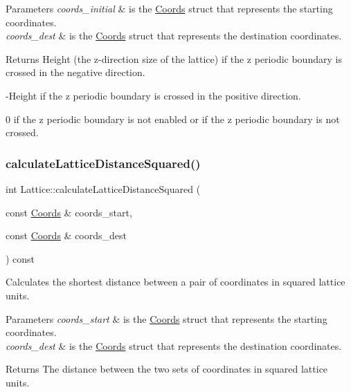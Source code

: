 \begin{DoxyParams}{Parameters}
{\em coords\+\_\+initial} & is the \hyperlink{struct_coords}{Coords} struct that represents the starting coordinates. \\
\hline
{\em coords\+\_\+dest} & is the \hyperlink{struct_coords}{Coords} struct that represents the destination coordinates. \\
\hline
\end{DoxyParams}
\begin{DoxyReturn}{Returns}
Height (the z-\/direction size of the lattice) if the z periodic boundary is crossed in the negative direction. 

-\/\+Height if the z periodic boundary is crossed in the positive direction. 

0 if the z periodic boundary is not enabled or if the z periodic boundary is not crossed. 
\end{DoxyReturn}
\mbox{\label{class_lattice_a3f51b0b41cf0e43e0469320310494a1e}} 
\subsubsection{\texorpdfstring{calculate\+Lattice\+Distance\+Squared()}{calculateLatticeDistanceSquared()}}
{\footnotesize\ttfamily int Lattice\+::calculate\+Lattice\+Distance\+Squared (\begin{DoxyParamCaption}\item[{const \hyperlink{struct_coords}{Coords} \&}]{coords\+\_\+start,  }\item[{const \hyperlink{struct_coords}{Coords} \&}]{coords\+\_\+dest }\end{DoxyParamCaption}) const}



Calculates the shortest distance between a pair of coordinates in squared lattice units. 


\begin{DoxyParams}{Parameters}
{\em coords\+\_\+start} & is the \hyperlink{struct_coords}{Coords} struct that represents the starting coordinates. \\
\hline
{\em coords\+\_\+dest} & is the \hyperlink{struct_coords}{Coords} struct that represents the destination coordinates. \\
\hline
\end{DoxyParams}
\begin{DoxyReturn}{Returns}
The distance between the two sets of coordinates in squared lattice units. 
\end{DoxyReturn}
\mbox{\label{class_lattice_ad0592298c4b92e9e84a768b95cd6d0f0}} 
